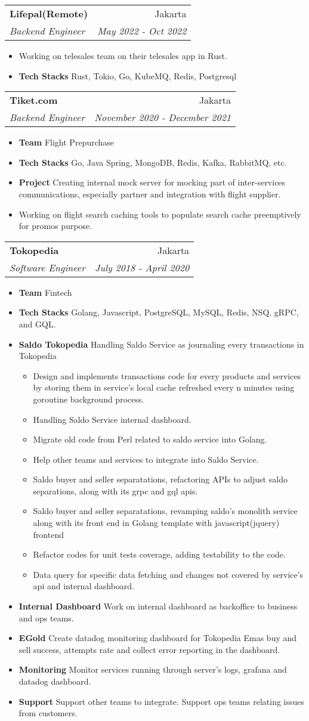 \documentclass[letterpaper,11pt]{article}
\makeatletter
\newcommand{\resumeItem}[2]{
  \item\small{
    \textbf{#1}{ #2 \vspace{-2pt}}
  }
}
\newcommand{\resumeText}[1]{
  \item\small{
    \textrm{#1}
  }
}
\newcommand{\resumeSubheading}[4]{
  \vspace{-1pt}\item
    \begin{tabular*}{0.97\textwidth}[t]{l@{\extracolsep{\fill}}r}
      \textbf{#1} & #2 \\
      \textit{\small#3} & \textit{\small #4} \\
    \end{tabular*}\vspace{-5pt}
}
\newcommand{\resumeItemListStart}{\begin{itemize}}
\newcommand{\resumeItemListEnd}{\end{itemize}\vspace{-5pt}}
\makeatother
\begin{document}
    \resumeSubheading
    {Lifepal(Remote)}{Jakarta}
    {Backend Engineer}{May 2022 - Oct 2022}
    \resumeItemListStart
      \resumeText
        {Working on telesales team on their telesales app in Rust.}
      \resumeItem{Tech Stacks}
        {Rust, Tokio, Go, KubeMQ, Redis, Postgresql}
    \resumeItemListEnd

    \resumeSubheading
      {Tiket.com}{Jakarta}
      {Backend Engineer}{November 2020 - December 2021}
      \resumeItemListStart
        \resumeItem{Team}
          {Flight Prepurchase}
        \resumeItem{Tech Stacks}
          {Go, Java Spring, MongoDB, Redis, Kafka, RabbitMQ, etc.}
        \resumeItem{Project}
          {Creating internal mock server for mocking part of inter-services communications, especially partner and integration with flight supplier.}
        \resumeText
          {Working on flight search caching tools to populate search cache preemptively for promos purpose.}
      \resumeItemListEnd

    \resumeSubheading
      {Tokopedia}{Jakarta}
      {Software Engineer}{July 2018 - April 2020}
      \resumeItemListStart
        \resumeItem{Team}{Fintech}
        \resumeItem{Tech Stacks}
          {Golang, Javascript, PostgreSQL, MySQL, Redis, NSQ, gRPC, and GQL.}
        \resumeItem{Saldo Tokopedia}
          {Handling Saldo Service as journaling every transactions in Tokopedia}
          \resumeItemListStart
            \resumeText{Design and implements transactions code for every products and services by storing them in service's local cache refreshed every n minutes using goroutine background process.}
            \resumeText{Handling Saldo Service internal dashboard.}
            \resumeText{Migrate old code from Perl related to saldo service into Golang.}
            \resumeText{Help other teams and services to integrate into Saldo Service.}
            \resumeText{Saldo buyer and seller separatations, refactoring APIs to adjust saldo separations, along with its grpc and gql apis.}
            \resumeText{Saldo buyer and seller separatations, revamping saldo's monolith service along with its front end in Golang template with javascript(jquery) frontend}
            \resumeText{Refactor codes for unit tests coverage, adding testability to the code.}
            \resumeText{Data query for specific data fetching and changes not covered by service's api and internal dashboard.}
          \resumeItemListEnd
        \resumeItem{Internal Dashboard}
          {Work on internal dashboard as backoffice to business and ops teams.}
        \resumeItem{EGold}
          {Create  datadog monitoring dashboard for Tokopedia Emas buy and sell success, attempts rate and collect error reporting in the dashboard.}
        \resumeItem{Monitoring}
          {Monitor services running through server's logs, grafana and datadog dashboard.}
        \resumeItem{Support}
          {Support other teams to integrate. Support ops teams relating issues from customers.}
      \resumeItemListEnd
\end{document}
